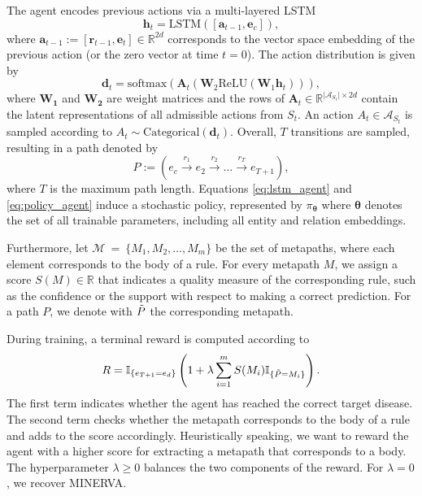 \documentclass{article}
\begin{document}
 The agent encodes previous actions via a multi-layered LSTM \cite{hochreiter1997long}
\begin{equation}
\label{eq:lstm_agent}
        \boldsymbol{h}_t = \text{LSTM}\left(\left[\boldsymbol{a}_{t-1}, \boldsymbol{e}_c\right]\right),
\end{equation}
where $\boldsymbol{a}_{t-1} := \left[\boldsymbol{r}_{t-1},\boldsymbol{e}_{t}\right] \in \mathbb{R}^{2d}$ corresponds to the vector space embedding of the previous action (or the zero vector at time $t=0$).
The action distribution is given by
\begin{equation}
\label{eq:policy_agent}
\boldsymbol{d}_t = \text{softmax}\left(\boldsymbol{A}_t \left(\boldsymbol{W}_2\text{ReLU}\left(\boldsymbol{W}_1 \boldsymbol{h}_t\right)\right)\right),
\end{equation}
where $\boldsymbol{W_1}$ and $\boldsymbol{W_2}$ are weight matrices and the rows of $\boldsymbol{A}_t \in \mathbb{R}^{\vert \mathcal{A}_{S_t} \vert \times 2d}$ contain the latent representations of all admissible actions from $S_t$. An action $A_t \in \mathcal{A}_{S_t}$ is sampled according to
$
    A_t \sim \text{Categorical}\left(\boldsymbol{d}_t\right).
$
Overall, $T$ transitions are sampled, resulting in a path denoted by $$
    P := (e_c \xrightarrow{r_1} e_2 \xrightarrow{r_2} \dots \xrightarrow{r_{T}} e_{T+1}) ,
$$ 
where $T$ is the maximum path length. 
Equations \eqref{eq:lstm_agent} and \eqref{eq:policy_agent} induce a stochastic policy, represented by $\pi_{\boldsymbol{\theta}}$ where $\boldsymbol{\theta}$ denotes the set of all trainable parameters, including all entity and relation embeddings.

Furthermore, let $\mathcal{M}~=~\{M_1, M_2, \dots, M_m\}$ be the set of metapaths, where each element corresponds to the body of a rule. %
For every metapath $M$, we assign a score $S(M)\in \mathbb{R}$ that indicates a quality measure of the corresponding rule, such as the confidence or the support with respect to making a correct prediction. For a path $P$, we denote with $\Tilde{P}$ the corresponding metapath. 

During training, a terminal reward is computed according to
\begin{equation*}
\label{eq:rewards}
    R =  \mathbb{I}_{\{e_{T+1} = e_d\}}\left(1 + \lambda \sum_{i = 1}^m S(M_i) \mathbb{I}_{\{\Tilde{P} = M_i\}}\right).
\end{equation*}
The first term indicates whether the agent has reached the correct target disease. The second term checks whether the metapath corresponds to the body of a rule and adds to the score accordingly. Heuristically speaking, we want to reward the agent with a higher score for extracting a metapath that corresponds to a body. The hyperparameter $\lambda \geq 0$ balances the two components of the reward. For $\lambda = 0$, we recover MINERVA.
\end{document}
